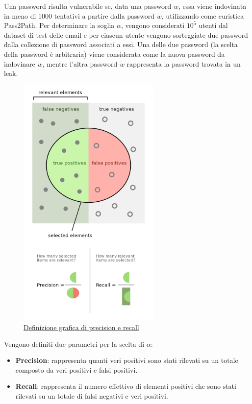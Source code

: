 Una password risulta vulnerabile se, data una password $w$, essa viene indovinata in meno di 1000 tentativi a partire dalla password $\tilde{w}$, utilizzando come euristica Pass2Path.
Per determinare la soglia $\alpha$, vengono considerati $10^5$ utenti dal dataset di test delle email e per ciascun utente vengono sorteggiate due password dalla collezione di password associati a essi. Una delle due password (la scelta della password è arbitraria) viene considerata come la nuova password da indovinare $w$, mentre l'altra password $\tilde{w}$ rappresenta la password trovata in un leak.
\begin{figure}[h!]
    \centering
    \includegraphics[width=7cm]{./immagini/precisionrecall.png}
    \caption{\href{https://upload.wikimedia.org/wikipedia/commons/2/26/Precisionrecall.svg}{Definizione grafica di precision e recall}}
    \label{precision recall}
\end{figure}
\FloatBarrier
Vengono definiti due parametri per la scelta di $\alpha$:
\begin{itemize}
    \item \textbf{Precision}: rappresenta quanti veri positivi sono stati rilevati su un totale composto da veri positivi e falsi positivi.
    \item \textbf{Recall}: rappresenta il numero effettivo di elementi positivi che sono stati rilevati su un totale di falsi negativi e veri positivi.
\end{itemize}
